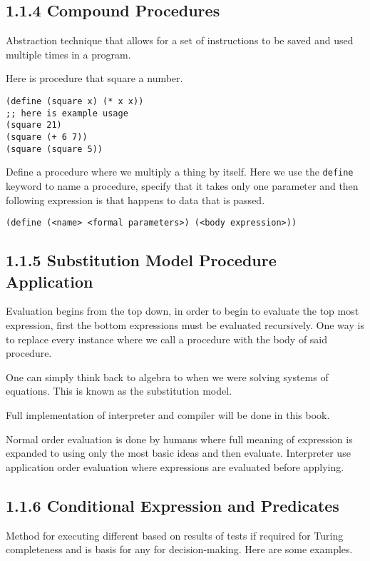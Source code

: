 \documentclass[11pt]{article}
\begin{document}
\subsection{1.1.4 Compound Procedures}
\label{sec:org923e289}
Abstraction technique that allows for a set of instructions to be saved
and used multiple times in a program.

Here is procedure that square a number.

\begin{verbatim}
(define (square x) (* x x))
;; here is example usage
(square 21)
(square (+ 6 7))
(square (square 5))
\end{verbatim}

Define a procedure where we multiply a thing by itself. Here we use the
\texttt{define} keyword to name a procedure, specify that it takes only one
parameter and then following expression is that happens to data that is
passed.

\begin{verbatim}
(define (<name> <formal parameters>) (<body expression>))
\end{verbatim}

\subsection{1.1.5 Substitution Model Procedure Application}
\label{sec:orgd3b2c6d}
Evaluation begins from the top down, in order to begin to evaluate the
top most expression, first the bottom expressions must be evaluated
recursively. One way is to replace every instance where we call a
procedure with the body of said procedure.

One can simply think back to algebra to when we were solving systems of
equations. This is known as the substitution model.

Full implementation of interpreter and compiler will be done in this
book.

Normal order evaluation is done by humans where full meaning of
expression is expanded to using only the most basic ideas and then
evaluate. Interpreter use application order evaluation where expressions
are evaluated before applying.

\subsection{1.1.6 Conditional Expression and Predicates}
\label{sec:org3825554}
Method for executing different based on results of tests if required for
Turing completeness and is basis for any for decision-making. Here are
some examples.
\end{document}
